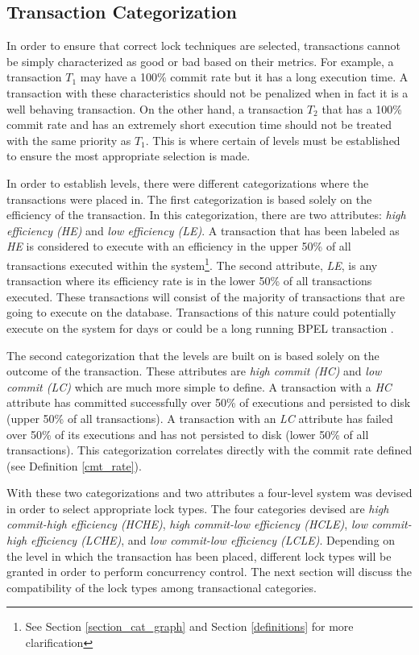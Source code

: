 \documentclass[conference]{IEEEtran}
\begin{document}
\subsection{Transaction Categorization}

In order to ensure that correct lock techniques are selected, transactions cannot be simply characterized as good or bad based on their metrics. For example, a transaction $T_{1}$ may have a 100\% commit rate but it has a long execution time. A transaction with these characteristics should not be penalized when in fact it is a well behaving transaction. On the other hand, a transaction $T_{2}$ that has a 100\% commit rate and has an extremely short execution time should not be treated with the same priority as $T_{1}$. This is where certain of levels must be established to ensure the most appropriate selection is made.

In order to establish levels, there were different categorizations where the transactions were placed in. The first categorization is based solely on the efficiency of the transaction. In this categorization, there are two attributes: \textit{high efficiency (HE)} and \textit{low efficiency (LE)}. A transaction that has been labeled as \textit{HE} is considered to execute with an efficiency in the upper 50\% of all transactions executed within the system\footnote{See Section \ref{section_cat_graph} and Section \ref{definitions} for more clarification}. The second attribute, \textit{LE}, is any transaction where its efficiency rate is in the lower 50\% of all transactions executed. These transactions will consist of the majority of transactions that are going to execute on the database. Transactions of this nature could potentially execute on the system for days or could be a long running BPEL transaction \cite{BPEL}.

The second categorization that the levels are built on is based solely on the outcome of the transaction. These attributes are \textit{high commit (HC)} and \textit{low commit (LC)} which are much more simple to define. A transaction with a \textit{HC} attribute has committed successfully over 50\% of executions and persisted to disk (upper 50\% of all transactions). A transaction with an \textit{LC} attribute has failed over 50\% of its executions and has not persisted to disk (lower 50\% of all transactions). This categorization correlates directly with the commit rate defined (see Definition \ref{cmt_rate}).

With these two categorizations and two attributes a four-level system was devised in order to select appropriate lock types. The four categories devised are \textit{high commit-high efficiency (HCHE)}, \textit{high commit-low efficiency (HCLE)}, \textit{low commit-high efficiency (LCHE)}, and \textit{low commit-low efficiency (LCLE)}. Depending on the level in which the transaction has been placed, different lock types will be granted in order to perform concurrency control. The next section will discuss the compatibility of the lock types among transactional categories.
\end{document}
